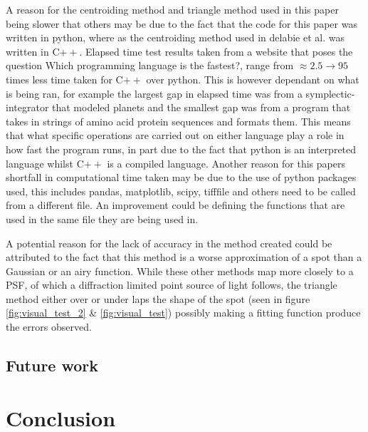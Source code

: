 \documentclass[aps,pra,a4paper,nofootinbib,onecolumn,tightenlines,longbibliography,12pt,amsfonts,amssymb,amsmath,floatfix]{revtex4-2} %
\begin{document}
  A reason for the centroiding method and triangle method used in this paper being slower that others may 
  be due to the fact that the code for this paper was written in python, where as the centroiding method used in 
  delabie et al. was written in C$++$. Elapsed time test results taken from a website that poses the question 
  Which programming language is the fastest?\cite{bagley}, range from $\approx 2.5\rightarrow 95$ times 
  less time taken for C$++$ over python. This is however dependant on what is being ran, for example the largest 
  gap in elapsed time was from a symplectic-integrator that modeled planets and the smallest gap was from a program 
  that takes in strings of amino acid protein sequences and formats them. This means that what specific operations 
  are carried out on either language play a role in how fast the program runs, in part due to the fact that 
  python is an interpreted language whilst C$++$ is a compiled language.
  Another reason for this papers shortfall in computational time taken may be due to the use of python 
  packages used, this includes pandas, matplotlib, scipy, tifffile and others need to be called from 
  a different file. An improvement could be defining the functions that are used in the same file they are 
  being used in.

  A potential reason for the lack of accuracy in the method created could be attributed to the fact that 
  this method is a worse approximation of a spot than a Gaussian or an airy function. While these other 
  methods map more closely to a PSF, of which a diffraction limited point source of light follows, the triangle 
  method either over or under laps the shape of the spot (seen in figure \ref{fig:visual_test_2} \& \ref{fig:visual_test}) 
  possibly making a fitting function produce the errors observed.


  \subsection{Future work} %
  \label{sub:Discuss improvement}
  

  


\section{Conclusion} %
\label{sec:Conclusion}
\end{document}
